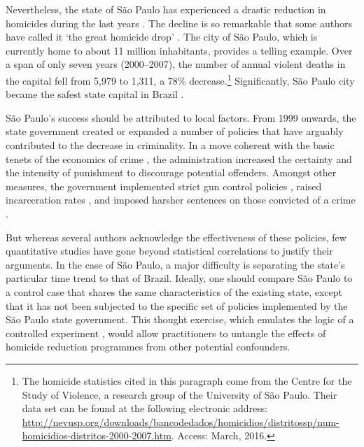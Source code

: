 Nevertheless, the state of São Paulo has experienced a drastic reduction in homicides during the last years \citep{camargo2007}. The decline is so remarkable that some authors have called it `the great homicide drop' \citep{goertzel2009}. The city of São Paulo, which is currently home to about 11 million inhabitants, provides a telling example. Over a span of only seven years (2000--2007), the number of annual violent deaths in the capital fell from 5,979 to 1,311, a 78\% decrease.\footnote{The homicide statistics cited in this paragraph come from the Centre for the Study of Violence, a research group of the University of São Paulo. Their data set can be found at the following electronic address: \url{http://nevusp.org/downloads/bancodedados/homicidios/distritossp/num-homicidios-distritos-2000-2007.htm}. Access: March, 2016.} Significantly, São Paulo city became the safest state capital in Brazil \citep{mapa2011}.

São Paulo's success should be attributed to local factors. From 1999 onwards, the state government created or expanded a number of policies that have arguably contributed to the decrease in criminality. In a move coherent with the basic tenets of the economics of crime \citep[e.g.][]{becker1968crime, cornish2014reasoning}, the administration increased the certainty and the intensity of punishment to discourage potential offenders. Amongst other measures, the government implemented strict gun control policies \citep{goertzel2009}, raised incarceration rates \citep{salla2007}, and imposed harsher sentences on those convicted of a crime \citep{carvalho2005}. 

But whereas several authors acknowledge the effectiveness of these policies, few quantitative studies have gone beyond statistical correlations to justify their arguments. In the case of São Paulo, a major difficulty is separating the state's particular time trend to that of Brazil. Ideally, one should compare São Paulo to a control case that shares the same characteristics of the existing state, except that it has not been subjected to the specific set of policies implemented by the São Paulo state government. This thought exercise, which emulates the logic of a controlled experiment \citep{angrist2008mostly, imbens2015causal, holland1986, morgan2014counterfactuals}, would allow practitioners to untangle the effects of homicide reduction programmes from other potential confounders. 

